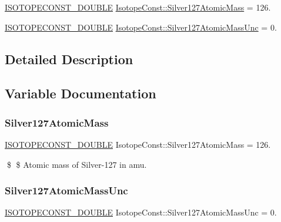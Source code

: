 \begin{DoxyCompactItemize}
\item 
\mbox{\hyperlink{group___isotope_const-_macros_ga8f45a7272ce02c0b4c65c44636ed719a}{I\+S\+O\+T\+O\+P\+E\+C\+O\+N\+S\+T\+\_\+\+D\+O\+U\+B\+LE}} \mbox{\hyperlink{group___isotope_const-_silver-_ag127_ga0828c8056b2fe4ca6dc59457dac7bba0}{Isotope\+Const\+::\+Silver127\+Atomic\+Mass}} = 126.
\item 
\mbox{\hyperlink{group___isotope_const-_macros_ga8f45a7272ce02c0b4c65c44636ed719a}{I\+S\+O\+T\+O\+P\+E\+C\+O\+N\+S\+T\+\_\+\+D\+O\+U\+B\+LE}} \mbox{\hyperlink{group___isotope_const-_silver-_ag127_ga3a3a4d628e0dcc1483391f44318b784d}{Isotope\+Const\+::\+Silver127\+Atomic\+Mass\+Unc}} = 0.
\end{DoxyCompactItemize}


\subsection{Detailed Description}


\subsection{Variable Documentation}
\mbox{\label{group___isotope_const-_silver-_ag127_ga0828c8056b2fe4ca6dc59457dac7bba0}} 
\subsubsection{\texorpdfstring{Silver127\+Atomic\+Mass}{Silver127AtomicMass}}
{\footnotesize\ttfamily \mbox{\hyperlink{group___isotope_const-_macros_ga8f45a7272ce02c0b4c65c44636ed719a}{I\+S\+O\+T\+O\+P\+E\+C\+O\+N\+S\+T\+\_\+\+D\+O\+U\+B\+LE}} Isotope\+Const\+::\+Silver127\+Atomic\+Mass = 126.}

\$ \$ Atomic mass of Silver-\/127 in amu. \mbox{\label{group___isotope_const-_silver-_ag127_ga3a3a4d628e0dcc1483391f44318b784d}} 
\subsubsection{\texorpdfstring{Silver127\+Atomic\+Mass\+Unc}{Silver127AtomicMassUnc}}
{\footnotesize\ttfamily \mbox{\hyperlink{group___isotope_const-_macros_ga8f45a7272ce02c0b4c65c44636ed719a}{I\+S\+O\+T\+O\+P\+E\+C\+O\+N\+S\+T\+\_\+\+D\+O\+U\+B\+LE}} Isotope\+Const\+::\+Silver127\+Atomic\+Mass\+Unc = 0.}

